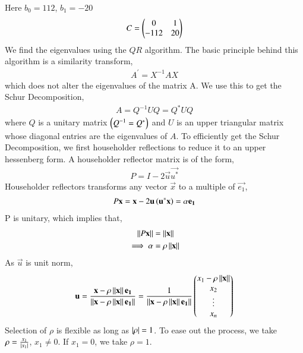 \documentclass[journal]{IEEEtran}
\begin{document}
Here $b_0 = 112$, $b_1 = -20$
\begin{align}
	C = \begin{pmatrix}0 & 1\\
	-112 & 20\end{pmatrix}
\end{align}
We find the eigenvalues using the $QR$ algorithm. The basic principle behind this algorithm is a similarity transform,
\begin{align}
	A^{\prime} = X^{-1}AX
\end{align}
which does not alter the eigenvalues of the matrix A. 
\newline
We use this to get the Schur Decomposition,
\begin{align}
	A = Q^{-1}UQ = Q^{\ast}UQ
\end{align}
where $Q$ is a unitary matrix $\left(Q^{-1} = Q^{\ast}\right)$ and $U$ is an upper triangular matrix whose diagonal entries are the eigenvalues of $A$.
\newline
To efficiently get the Schur Decomposition, we first householder reflections to reduce it to an upper hessenberg form.
\newline
A householder reflector matrix is of the form,
\begin{align}
	P = I - 2\vec{u}\vec{u^{\ast}}
\end{align}
Householder reflectors transforms any vector $\vec{x}$ to a multiple of $\vec{e_1}$,
\begin{align}
	P\mathbf{x} = \mathbf{x} - 2\mathbf{u}\left(\mathbf{u^{\ast}}\mathbf{x}\right) = \alpha \mathbf{e_1}
\end{align}
P is unitary, which implies that,
\begin{align}
	\left\lVert P\mathbf{x}\right\rVert &= \left\lVert\mathbf{x}\right\rVert\\
	\implies \alpha &= \rho\left\lVert\mathbf{x}\right\rVert\\
\end{align}
As $\vec{u}$ is unit norm,
\begin{align}
	\mathbf{u} = \frac{\mathbf{x} - \rho\left\lVert\mathbf{x}\right\rVert\mathbf{e_1}}{\left\lVert\mathbf{x} - \rho\left\lVert\mathbf{x}\right\rVert\mathbf{e_1}\right\rVert} = \frac{1}{\left\lVert\mathbf{x} - \rho\left\lVert\mathbf{x}\right\rVert\mathbf{e_1}\right\rVert} \begin{pmatrix} x_1 - \rho\left\lVert\mathbf{x}\right\rVert\\x_2\\\vdots\\x_n\end{pmatrix}
\end{align}
Selection of $\rho$ is flexible as long as $\left\vert\rho\right\vert = 1$. To ease out the process, we take $\rho = \frac{x_1}{\left\vert x_1\right\vert}$, $x_1 \neq 0$. If $x_1 = 0$, we take $\rho = 1$.
\newline
\end{document}
